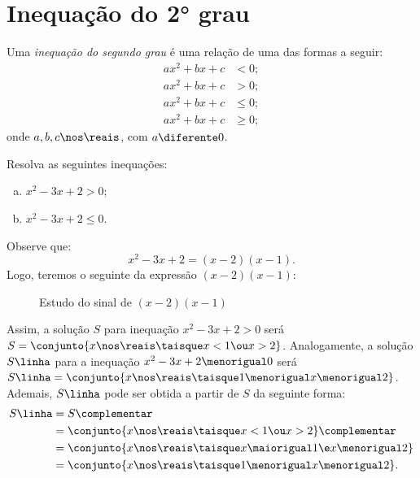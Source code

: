 \section{Inequação do 2° grau}

\begin{definition}
    Uma \emph{inequação do segundo grau} é uma relação de uma das formas
    a seguir:
    \begin{align*}
        ax^2 + bx + c &< 0;   \\
        ax^2 + bx + c &> 0;   \\
        ax^2 + bx + c &\le 0; \\
        ax^2 + bx + c &\ge 0;
    \end{align*}
    onde $a, b, c \nos \reais$, com $a \diferente 0$.
\end{definition}

\begin{example}
    Resolva as seguintes inequações:
    \begin{enumerate}[a)]
        \item $x^2 -3x +2 > 0$;
        \item $x^2 -3x +2 \le 0$.
    \end{enumerate}
\end{example}

\begin{solution}
    Observe que: 
    \[
        x^2 - 3x + 2 = (x-2)(x-1).
    \]
    Logo, teremos o seguinte  da expressão $(x-2)(x-1)$:
    \begin{figure}[H]
        \centering
        \caption{Estudo do sinal de $(x-2)(x-1)$}
    \end{figure}

    Assim, a solução $S$ para inequação $x^2 -3x +2 > 0$ será $S = \conjunto{ x \nos \reais \taisque x < 1 \ou x > 2 }$. Analogamente, a solução $S\linha$ para a inequação $x^2 - 3x + 2 \menorigual 0$ será $S\linha = \conjunto{ x \nos \reais \taisque 1 \menorigual x \menorigual 2 }$. Ademais, $S\linha$ pode ser obtida a partir de $S$ da seguinte forma:
    \begin{align*}
        S\linha &= S\complementar \\ 
                &= \conjunto{ x \nos \reais \taisque x < 1 \ou x > 2 }\complementar \\ 
                &= \conjunto{ x \nos \reais \taisque x \maiorigual 1 \e x \menorigual 2 } \\ 
                &= \conjunto{ x \nos \reais \taisque 1 \menorigual x \menorigual 2 }.
    \end{align*}
\end{solution}


